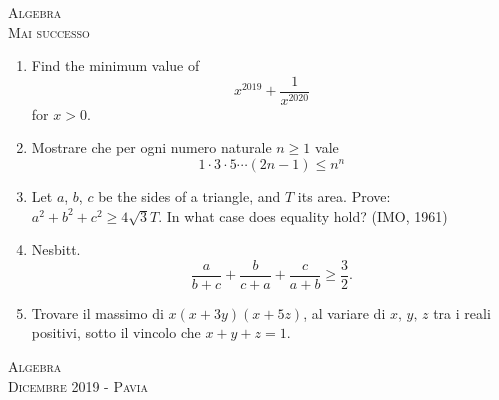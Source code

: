 \documentclass[a4paper]{article}
\theoremstyle{remark}
\theoremstyle{definition}
\begin{document}
\newpage
\begin{center}
	\vspace*{0,5 cm}
	{\Huge \textsc{Algebra}} \\
	\vspace{0,5 cm}
	\textsc{Mai successo}
	\thispagestyle{empty}
	\vspace{0,7 cm}
\end{center}
\normalsize
\begin{enumerate}
	\item Find the minimum value of
	\[ x^{2019} + \frac{1}{x^{2020}} \]
	for $ x > 0 $.
	
	\item Mostrare che per ogni numero naturale $ n \geq 1 $ vale
	\[ 1 \cdot 3 \cdot 5 \cdots (2n-1) \leq n^n \]
	
	\item Let $ a $, $ b $, $ c $ be the sides of a triangle, and $ T $ its area. Prove: $ a^2+b^2+c^2 \geq 4\sqrt{3}T $. In what case does
	equality hold? (IMO, 1961)
	
	\item Nesbitt.
	\[ \frac{a}{b+c} + \frac{b}{c+a} + \frac{c}{a + b} \geq \frac{3}{2}. \]
	
	\item Trovare il massimo di $ x(x + 3y)(x + 5z) $, al variare di $ x, \, y, \, z $ tra i reali positivi, sotto il vincolo che $ x + y +z = 1 $.
	
\end{enumerate}

\newpage
\begin{center}
	\vspace*{0,5 cm}
	{\Huge \textsc{Algebra}} \\
	\vspace{0,5 cm}
	\textsc{Dicembre 2019 - Pavia}
	\thispagestyle{empty}
	\vspace{0,7 cm}
\end{center}
\normalsize
\end{document}
